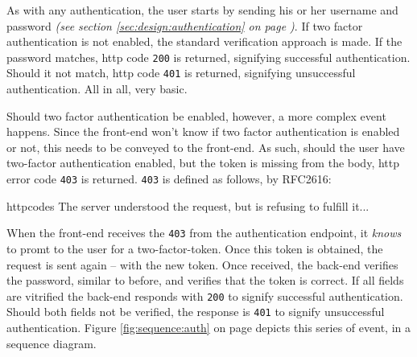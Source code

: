 		As with any authentication, the user starts by sending his or her username and password \emph{(see section \ref{sec:design:authentication} on page \pageref{sec:design:authentication})}. If two factor authentication is not enabled, the standard verification approach is made. If the password matches, http code \verb=200= is returned, signifying successful authentication. Should it not match, http code \verb=401= is returned, signifying unsuccessful authentication. All in all, very basic.

		Should two factor authentication be enabled, however, a more complex event happens. Since the front-end won't know if two factor authentication is enabled or not, this needs to be conveyed to the front-end. As such, should the user have two-factor authentication enabled, but the token is missing from the body, http error code \verb=403= is returned. \verb=403= is defined as follows, by RFC2616\cite{httpcodes}:
		\begin{citequote}[sec.10.4.4]{httpcodes}
			   The server understood the request, but is refusing to fulfill it...
		\end{citequote}
		When the front-end receives the \verb=403= from the authentication endpoint, it \emph{knows} to promt to the user for a two-factor-token. Once this token is obtained, the request is sent again -- with the new token. Once received, the back-end verifies the password, similar to before, and verifies that the token is correct. If all fields are vitrified the back-end responds with \verb=200= to signify successful authentication. Should both fields not be verified, the response is \verb=401= to signify unsuccessful authentication. Figure \ref{fig:sequence:auth} on page \pageref{fig:sequence:auth} depicts this series of event, in a sequence diagram.

